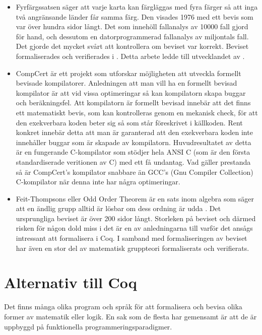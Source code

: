 \begin{itemize}
\item Fyrfärgssatsen \autocite{gonthier2008formal}\cite{gonthier2005computer}
säger att varje karta kan färgläggas med fyra färger så att inga två
angränsande länder får samma färg. Den visades 1976 med ett bevis som var över
hundra sidor långt. Det som innehöll fallanalys av 10000 fall gjord för hand,
och dessutom en datorprogrammerad fallanalys av miljontals fall. Det gjorde det
mycket svårt att kontrollera om beviset var korrekt. Beviset formaliserades och
verifierades i . Detta arbete ledde till utvecklandet av \ssr.

\item CompCert\autocite{compcert} är ett projekt som utforskar möjligheten att
utveckla formellt bevisade kompilatorer. Anledningen att man vill ha en
formellt bevisad kompilator är att vid vissa optimeringar så kan kompilatorn
skapa buggar och beräkningsfel. Att kompilatorn är formellt bevisad innebär att
det finns ett matematiskt bevis, som kan kontrolleras genom en mekanisk check,
för att den exekverbara koden beter sig så som står föreskrivet i källkoden.
Rent konkret innebär detta att man är garanterad att den exekverbara koden inte
innehåller buggar som är skapade av kompilatorn. Huvudresultatet av detta är en
fungerande C-kompilator som stödjer hela ANSI C (som är den första
standardiserade veritionen av C) med ett få undantag. Vad gäller prestanda så
är CompCert's kompilator snabbare än GCC's (Gnu Compiler Collection)
C-kompilator när denna inte har några optimeringar.

\item Feit-Thompsons eller Odd Order Theorem är en sats inom algebra som säger
att en ändlig grupp alltid är lösbar om dess ordning är udda
\cite{gonthier2013oddorderproof}. Det ursprungliga beviset är över 200 sidor
långt\cite{feit1963}. Storleken på beviset och därmed risken för någon dold
miss i det är en av anledningarna till varför det ansågs intressant att
formalisera i Coq. I samband med formaliseringen av beviset har även en stor
del av matematisk gruppteori formaliserats och verifierats.
\end{itemize}

\section{Alternativ till Coq}
Det finns många olika program och språk för att formalisera och bevisa olika
former av matematik eller logik. En sak som de flesta har gemensamt är att de
är uppbyggd på funktionella programmeringsparadigmer.

